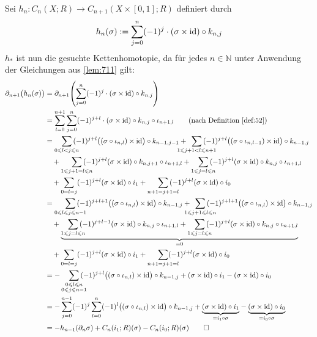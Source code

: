 \begin{beweis}[{name={von \eqref{eq:79}}}]
	Sei $h_n \colon C_n(X;R) \to C_{n+1}(X \times [0,1];R)$ definiert durch
	\[
		h_n(\sigma) := \sum_{j=0}^{n} (-1)^j \cdot \enbrace*{\sigma \times \id} \circ k_{n,j}
	\]
	$h_*$ ist nun die gesuchte Kettenhomotopie, da für jedes $n \in \mathbb{N}$ unter Anwendung der Gleichungen aus \autoref{lem:711} gilt:
	\begin{align*}
		\partial_{n+1} \enbrace[\big]{h_n(\sigma)} &= \partial_{n+1} \enbrace*{\sum_{j=0}^{n} (-1)^j \cdot (\sigma \times \id) \circ k_{n,j}} \\
		&=  \sum_{l=0}^{n+1} \sum_{j=0}^{n} (-1)^{j+l} \cdot \enbrace*{ \sigma \times \id} \circ k_{n,j} \circ \iota_{n+1,l} \tag*{(nach Definition \ref{def:52})}\\
		&= \smashoperator[r]{\sum_{0 \le l < j \le n}} \, (-1)^{j+l} \enbrace[\big]{(\sigma \circ \iota_{n,l}) \times \id} \circ k_{n-1,j-1} 
		+ \enspace\smashoperator{\sum_{1 \le j+1 < l \le n+1}}\, (-1)^{j+l} \enbrace[\big]{(\sigma \circ \iota_{n,l-1}) \times \id} \circ k_{n-1,j} \\
		& \quad + \smashoperator[r]{\sum_{1 \le j+1=l \le n}} \,(-1)^{j+l} (\sigma \times \id) \circ k_{n,j+1} \circ \iota_{n+1,l} 
		+ \smashoperator[r]{\sum_{1 \le j=l \le n}} \, (-1)^{j+l} (\sigma\times\id) \circ k_{n,j}\circ \iota_{n+1,l} \\
		& \quad + \sum_{0=l=j}  (-1)^{j+l} (\sigma \times \id) \circ i_1 
		+ \smashoperator[r]{\sum_{n+1=j+1=l}}\, (-1)^{j+l} (\sigma \times \id) \circ i_0 \\
		&= \smashoperator[r]{\sum_{0 \le l \le j \le n-1}}\, (-1)^{j+l+1} \enbrace[\big]{(\sigma \circ \iota_{n,l}) \times \id} \circ k_{n-1,j} 
		+ \enspace\smashoperator{\sum_{1 \le j+1 \le l \le n}} \,(-1)^{j+l+1} \enbrace[\big]{(\sigma \circ \iota_{n,l}) \times \id} \circ k_{n-1,j} \\
		& \quad + \underbrace{\smashoperator[r]{\sum_{1 \le j=l \le n}}\, (-1)^{j+l-1} (\sigma \times \id) \circ k_{n,j} \circ \iota_{n+1,l} 
		+ \smashoperator[r]{\sum_{1 \le j=l \le n}} \,(-1)^{j+l} (\sigma\times \id) \circ k_{n,j} \circ \iota_{n+1,l}}_{=0} \\
		& \quad + \sum_{0=l=j}  (-1)^{j+l} (\sigma \times \id) \circ i_1 + \smashoperator[r]{\sum_{n+1=j+1=l}} (-1)^{j+l} (\sigma\times \id) \circ i_0 \\
		&= - \smashoperator[r]{\sum_{\substack{0 \le l\le n \\ 0 \le j \le n-1}}} \,(-1)^{j+l} \enbrace[\big]{ \enbrace*{\sigma \circ \iota_{n,l}} \times \id } \circ k_{n-1,j} 
		+ (\sigma\times \id) \circ i_1  - (\sigma\times \id) \circ i_0 \\
		&= - \sum_{j=0}^{n-1} (-1)^j \sum_{l=0}^{n} (-1)^{l} \enbrace[\big]{ \enbrace*{\sigma \circ \iota_{n,l}} \times \id } \circ k_{n-1,j}
		+ {\underbrace{(\sigma\times \id) \circ i_1}_{= i_1 \circ \sigma}}  - \underbrace{(\sigma\times \id) \circ i_0}_{= i_0 \circ \sigma} \\
		&= - h_{n-1}(\partial_n \sigma) + C_n(i_1;R)(\sigma) - C_n(i_0;R)(\sigma) \qedhere  
	\end{align*}
\end{beweis}

